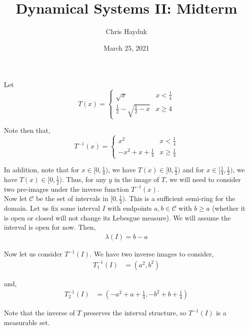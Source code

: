 \documentclass[12pt]{article}
\newenvironment{problem}[2][Problem]{\begin{trivlist}
\item[\hskip \labelsep {\bfseries #1}\hskip \labelsep {\bfseries #2.}]}{\end{trivlist}}
\begin{document}
\title{Dynamical Systems II: Midterm}

\author{Chris Hayduk}
\date{March 25, 2021}

\maketitle

\begin{problem}{1}
\end{problem}

Let $$T(x) = \begin{cases} 
      \sqrt{x} & x < \frac{1}{4} \\
      \frac{1}{2} - \sqrt{\frac{1}{2} - x} & x \geq 4
   \end{cases}$$
   
Note then that,
$$T^{-1}(x) = \begin{cases} 
      x^2 & x < \frac{1}{4} \\
      -x^2+x+\frac{1}{4} & x \geq \frac{1}{4}
   \end{cases}$$
   
In addition, note that for $x \in [0, \frac{1}{4})$, we have $T(x) \in [0, \frac{1}{2})$ and for $x \in [\frac{1}{4}, \frac{1}{2})$, we have $T(x) \in [0, \frac{1}{2})$. Thus, for any $y$ in the image of $T$, we will need to consider two pre-images under the inverse function $T^{-1}(x)$.\\

Now let $\mathcal{C}$ be the set of intervals in $[0, \frac{1}{2})$. This is a sufficient semi-ring for the domain. Let us fix some interval $I$ with endpoints $a, b \in \mathcal{C}$ with $b \geq a$ (whether it is open or closed will not change its Lebesgue measure). We will assume the interval is open for now. Then,
\begin{align*}
\lambda(I) = b - a
\end{align*}

Now let us consider $T^{-1}(I)$. We have two inverse images to consider,
\begin{align*}
T_1^{-1}(I) &= (a^2, b^2) 
\end{align*}

and,
\begin{align*}
T_2^{-1}(I) &= (-a^2+a+\frac{1}{4}, -b^2+b+\frac{1}{4})
\end{align*}

Note that the inverse of $T$ preserves the interval structure, so $T^{-1}(I)$ is a measurable set.\\
\end{document}
